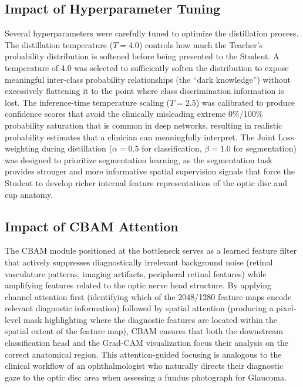 \documentclass[conference]{IEEEtran}
\begin{document}
\subsection{Impact of Hyperparameter Tuning}
Several hyperparameters were carefully tuned to optimize the distillation process. The distillation temperature ($T{=}4.0$) controls how much the Teacher's probability distribution is softened before being presented to the Student. A temperature of 4.0 was selected to sufficiently soften the distribution to expose meaningful inter-class probability relationships (the ``dark knowledge'') without excessively flattening it to the point where class discrimination information is lost. The inference-time temperature scaling ($T{=}2.5$) was calibrated to produce confidence scores that avoid the clinically misleading extreme 0\%/100\% probability saturation that is common in deep networks, resulting in realistic probability estimates that a clinician can meaningfully interpret. The Joint Loss weighting during distillation ($\alpha{=}0.5$ for classification, $\beta{=}1.0$ for segmentation) was designed to prioritize segmentation learning, as the segmentation task provides stronger and more informative spatial supervision signals that force the Student to develop richer internal feature representations of the optic disc and cup anatomy.

\subsection{Impact of CBAM Attention}
The CBAM module positioned at the bottleneck serves as a learned feature filter that actively suppresses diagnostically irrelevant background noise (retinal vasculature patterns, imaging artifacts, peripheral retinal features) while amplifying features related to the optic nerve head structure. By applying channel attention first (identifying which of the 2048/1280 feature maps encode relevant diagnostic information) followed by spatial attention (producing a pixel-level mask highlighting where the diagnostic features are located within the spatial extent of the feature map), CBAM ensures that both the downstream classification head and the Grad-CAM visualization focus their analysis on the correct anatomical region. This attention-guided focusing is analogous to the clinical workflow of an ophthalmologist who naturally directs their diagnostic gaze to the optic disc area when assessing a fundus photograph for Glaucoma.

\end{document}
